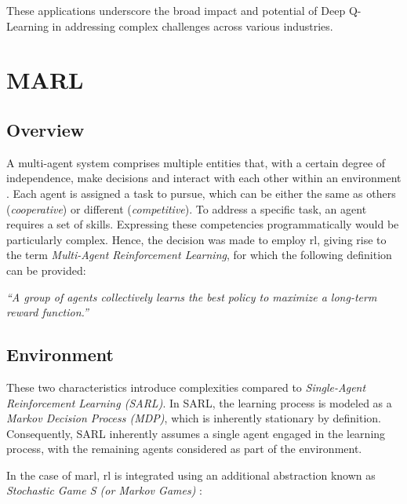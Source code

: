 \documentclass[12pt,a4paper,openright,twoside]{book}
\begin{document}
These applications underscore the broad impact and potential of Deep Q-Learning in addressing complex challenges across various industries.
    
\newpage

\section{MARL}

\subsection{Overview}
A multi-agent system comprises multiple entities that, with a certain degree of independence, make decisions 
and interact with each other within an environment \cite{weiss1999multiagent}. Each agent is assigned a task to pursue, which can be 
either the same as others (\emph{cooperative}) or different (\emph{competitive}). To address a specific task, an agent 
requires a set of skills. Expressing these competencies programmatically would be particularly complex. Hence, the decision was made to employ \ac{rl}, 
giving rise to the term \emph{Multi-Agent Reinforcement Learning}, for which the following definition can be provided:

\emph{``A group of agents collectively learns the best policy to maximize a long-term reward function.''}

\subsection{Environment}
These two characteristics introduce complexities compared to \emph{Single-Agent Reinforcement 
Learning (SARL)}. In SARL, the learning process is modeled as a \emph{Markov Decision Process (MDP)},
 which is inherently stationary by definition. Consequently, SARL inherently assumes a single
  agent engaged in the learning process, with the remaining agents considered as part of the 
  environment.

In the case of \ac{marl}, \ac{rl} is integrated using an additional abstraction 
known as \emph{Stochastic Game S (or Markov Games)} \cite{LITTMAN1994157}:
\end{document}
